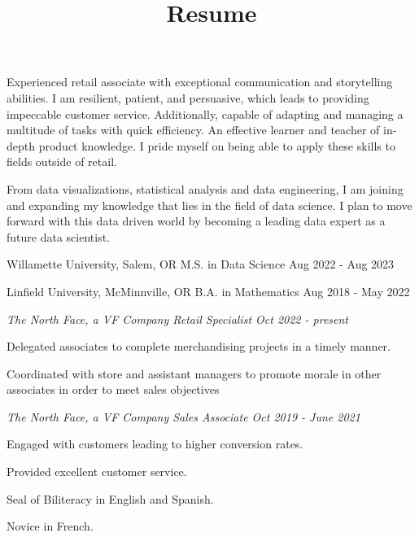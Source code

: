 \documentclass[
  letterpaper,
  DIV=11,
  numbers=noendperiod]{scrartcl}
\title{Resume}
\author{}
\date{}
\begin{document}
\maketitle
\renewcommand*\contentsname{Table of contents}
{
\setcounter{tocdepth}{}
\tableofcontents
}
\startsectionlevel[title={Background},reference={background}]

Experienced retail associate with exceptional communication and
storytelling abilities. I am resilient, patient, and persuasive, which
leads to providing impeccable customer service. Additionally, capable of
adapting and managing a multitude of tasks with quick efficiency. An
effective learner and teacher of in-depth product knowledge. I pride
myself on being able to apply these skills to fields outside of retail.

\stopsectionlevel

\startsectionlevel[title={Goal},reference={goal}]

From data visualizations, statistical analysis and data engineering, I
am joining and expanding my knowledge that lies in the field of data
science. I plan to move forward with this data driven world by becoming
a leading data expert as a future data scientist.

\stopsectionlevel

\startsectionlevel[title={Education},reference={education}]

Willamette University, Salem, OR  M.S. in Data Science
 Aug 2022 - Aug 2023

Linfield University, McMinnville, OR  B.A. in Mathematics
 Aug 2018 - May 2022

\stopsectionlevel

\startsectionlevel[title={Domain
Experience},reference={domain-experience}]

{\em The North Face, a VF Company  Retail Specialist
 Oct 2022 - present}

\startitemize[packed]
\item
  Delegated associates to complete merchandising projects in a timely
  manner.
\item
  Coordinated with store and assistant managers to promote morale in
  other associates in order to meet sales objectives
\stopitemize

{\em The North Face, a VF Company  Sales Associate
 Oct 2019 - June 2021}

\startitemize[packed]
\item
  Engaged with customers leading to higher conversion rates.
\item
  Provided excellent customer service.
\stopitemize

\stopsectionlevel

\startsectionlevel[title={Languages},reference={languages}]

\startitemize[packed]
\item
  Seal of Biliteracy in English and Spanish.
\item
  Novice in French.
\stopitemize

\stopsectionlevel
\end{document}
